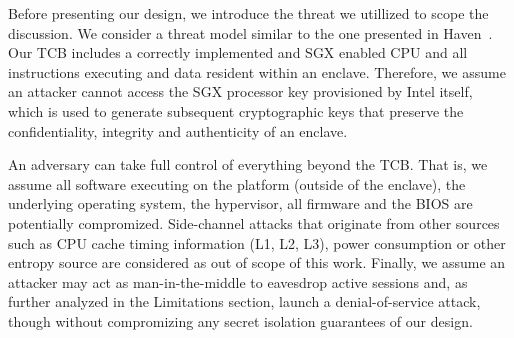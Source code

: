 \documentclass[../main.tex]{subfiles}
\begin{document}
Before presenting our design, we introduce the threat we utillized to
scope the discussion. We consider a threat model similar to the one
presented in Haven~\cite{Baumann14}. Our TCB includes a correctly
implemented and SGX enabled CPU and all instructions executing and
data resident within an enclave. Therefore, we assume an attacker
cannot access the SGX processor key provisioned by Intel itself, which
is used to generate subsequent cryptographic keys that preserve the
confidentiality, integrity and authenticity of an enclave.

An adversary can take full control of everything beyond the TCB. That
is, we assume all software executing on the platform (outside of the
enclave), the underlying operating system, the hypervisor, all
firmware and the BIOS are potentially compromized. Side-channel
attacks that originate from other sources such as CPU cache timing
information (L1, L2, L3), power consumption or other entropy source
are considered as out of scope of this work. Finally, we assume an
attacker may act as man-in-the-middle to eavesdrop active sessions
and, as further analyzed in the Limitations section, launch a
denial-of-service attack, though without compromizing any secret
isolation guarantees of our design.
\end{document}
